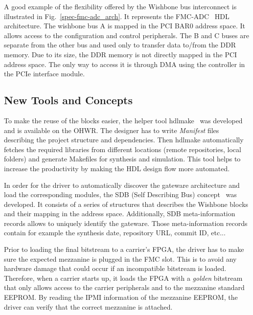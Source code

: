 \documentclass{JAC2003}
\begin{document}
A good example of the flexibility offered by the Wishbone bus interconnect is illustrated in Fig.~\ref{spec-fmc-adc_arch}.
It represents the FMC-ADC~\cite{fmc-adc} HDL architecture.
The wishbone bus A is mapped in the PCI BAR0 address space.
It allows access to the configuration and control peripherals.
The B and C buses are separate from the other bus and used only to transfer data to/from the DDR memory.
Due to its size, the DDR memory is not directly mapped in the PCI address space.
The only way to access it is through DMA using the controller in the PCIe interface module.

\subsection{New Tools and Concepts}

To make the reuse of the blocks easier, the helper tool hdlmake~\cite{hdlmake} was developed and is available on the OHWR.
The designer has to write \textit{Manifest} files describing the project structure and dependencies.
Then hdlmake automatically fetches the required libraries from different locations (remote repositories, local folders) and generate Makefiles for synthesis and simulation.
This tool helps to increase the productivity by making the HDL design flow more automated.

In order for the driver to automatically discover the gateware architecture and load the corresponding modules, the SDB (Self Describing Bus) concept~\cite{sdb} was developed.
It consists of a series of structures that describes the Wishbone blocks and their mapping in the address space.
Additionally, SDB meta-information records allows to uniquely identify the gateware.
Those meta-information records contain for example the synthesis date, repository URL, commit ID, etc...

Prior to loading the final bitstream to a carrier's FPGA, the driver has to make sure the expected mezzanine is plugged in the FMC slot.
This is to avoid any hardware damage that could occur if an incompatible bitstream is loaded.
Therefore, when a carrier starts up, it loads the FPGA with a \textit{golden} bitstream that only allows access to the carrier peripherals and to the mezzanine standard EEPROM.
By reading the IPMI information of the mezzanine EEPROM, the driver can verify that the correct mezzanine is attached.
\end{document}
